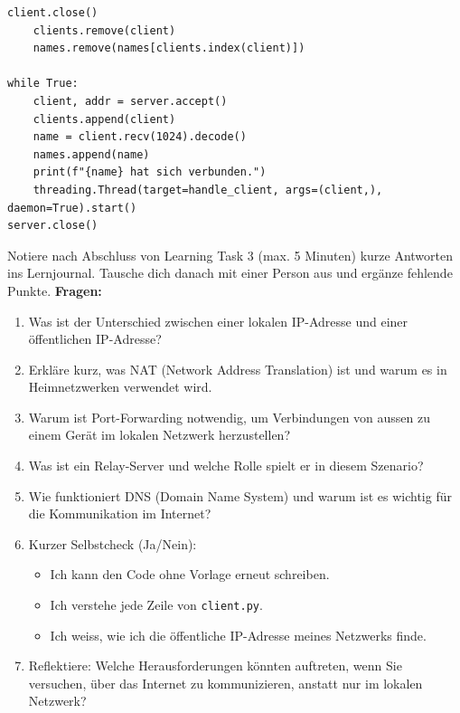 \begin{myexercise}
\begin{myanswer}
\begin{lstlisting}[caption=\texttt{server.py}]
    client.close()
    clients.remove(client)
    names.remove(names[clients.index(client)])

while True:
    client, addr = server.accept()
    clients.append(client)
    name = client.recv(1024).decode()
    names.append(name)
    print(f"{name} hat sich verbunden.")
    threading.Thread(target=handle_client, args=(client,), daemon=True).start()
server.close()
        \end{lstlisting}
    \end{myanswer}
\end{myexercise}

\begin{myexercise}
    Notiere nach Abschluss von Learning Task 3 (max. 5 Minuten) kurze Antworten ins Lernjournal. Tausche dich danach mit einer Person aus und ergänze fehlende Punkte.
    \textbf{Fragen:}
    \begin{enumerate}
        \item Was ist der Unterschied zwischen einer lokalen IP-Adresse und einer öffentlichen IP-Adresse?
        \item Erkläre kurz, was NAT (Network Address Translation) ist und warum es in Heimnetzwerken verwendet wird.
        \item Warum ist Port-Forwarding notwendig, um Verbindungen von aussen zu einem Gerät im lokalen Netzwerk herzustellen?
        \item Was ist ein Relay-Server und welche Rolle spielt er in diesem Szenario?
        \item Wie funktioniert DNS (Domain Name System) und warum ist es wichtig für die Kommunikation im Internet?
        \item Kurzer Selbstcheck (Ja/Nein):
              \begin{itemize}
                  \item Ich kann den Code ohne Vorlage erneut schreiben.
                  \item Ich verstehe jede Zeile von \texttt{client.py}.
                  \item Ich weiss, wie ich die öffentliche IP-Adresse meines Netzwerks finde.
              \end{itemize}
        \item Reflektiere: Welche Herausforderungen könnten auftreten, wenn Sie versuchen, über das Internet zu kommunizieren, anstatt nur im lokalen Netzwerk?
    \end{enumerate}
    \begin{myanswer}

\end{myanswer}
\end{myexercise}
